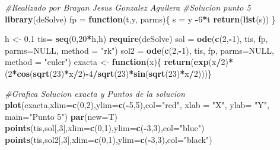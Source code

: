 \documentclass[]{article}
\newenvironment{Shaded}{\begin{snugshade}}{\end{snugshade}}
\newcommand{\KeywordTok}[1]{\textcolor[rgb]{0.13,0.29,0.53}{\textbf{#1}}}
\newcommand{\DataTypeTok}[1]{\textcolor[rgb]{0.13,0.29,0.53}{#1}}
\newcommand{\DecValTok}[1]{\textcolor[rgb]{0.00,0.00,0.81}{#1}}
\newcommand{\FloatTok}[1]{\textcolor[rgb]{0.00,0.00,0.81}{#1}}
\newcommand{\StringTok}[1]{\textcolor[rgb]{0.31,0.60,0.02}{#1}}
\newcommand{\CommentTok}[1]{\textcolor[rgb]{0.56,0.35,0.01}{\textit{#1}}}
\newcommand{\OtherTok}[1]{\textcolor[rgb]{0.56,0.35,0.01}{#1}}
\newcommand{\ControlFlowTok}[1]{\textcolor[rgb]{0.13,0.29,0.53}{\textbf{#1}}}
\newcommand{\OperatorTok}[1]{\textcolor[rgb]{0.81,0.36,0.00}{\textbf{#1}}}
\newcommand{\NormalTok}[1]{#1}
\begin{document}
\begin{Shaded}
\begin{Highlighting}[]
\CommentTok{#Realizado por Brayan Jesus Gonzalez Aguilera}
\CommentTok{#Solucion punto 5}
\KeywordTok{library}\NormalTok{(deSolve)}
\NormalTok{fp =}\StringTok{ }\ControlFlowTok{function}\NormalTok{(t,y, parms)\{}
\NormalTok{  s =}\StringTok{ }\NormalTok{y }\OperatorTok{-}\DecValTok{6}\OperatorTok{*}\NormalTok{t}
  \KeywordTok{return}\NormalTok{(}\KeywordTok{list}\NormalTok{(s))}
\NormalTok{\}}

\NormalTok{h <-}\StringTok{ }\FloatTok{0.1}
\NormalTok{tis=}\StringTok{ }\KeywordTok{seq}\NormalTok{(}\DecValTok{0}\NormalTok{,}\DecValTok{20}\OperatorTok{*}\NormalTok{h,h)}
\KeywordTok{require}\NormalTok{(deSolve)}
\NormalTok{sol =}\StringTok{ }\KeywordTok{ode}\NormalTok{(}\KeywordTok{c}\NormalTok{(}\DecValTok{2}\NormalTok{,}\OperatorTok{-}\DecValTok{1}\NormalTok{), tis, fp, }\DataTypeTok{parms=}\OtherTok{NULL}\NormalTok{, }\DataTypeTok{method =} \StringTok{"rk"}\NormalTok{)}
\NormalTok{sol2 =}\StringTok{ }\KeywordTok{ode}\NormalTok{(}\KeywordTok{c}\NormalTok{(}\DecValTok{2}\NormalTok{,}\OperatorTok{-}\DecValTok{1}\NormalTok{), tis, fp, }\DataTypeTok{parms=}\OtherTok{NULL}\NormalTok{, }\DataTypeTok{method =} \StringTok{"euler"}\NormalTok{)}
\NormalTok{exacta <-}\StringTok{ }\ControlFlowTok{function}\NormalTok{(x)\{ }\KeywordTok{return}\NormalTok{(}\KeywordTok{exp}\NormalTok{(x}\OperatorTok{/}\DecValTok{2}\NormalTok{)}\OperatorTok{*}\NormalTok{(}\DecValTok{2}\OperatorTok{*}\KeywordTok{cos}\NormalTok{(}\KeywordTok{sqrt}\NormalTok{(}\DecValTok{23}\NormalTok{)}\OperatorTok{*}\NormalTok{x}\OperatorTok{/}\DecValTok{2}\NormalTok{)}\OperatorTok{-}\DecValTok{4}\OperatorTok{/}\KeywordTok{sqrt}\NormalTok{(}\DecValTok{23}\NormalTok{)}\OperatorTok{*}\KeywordTok{sin}\NormalTok{(}\KeywordTok{sqrt}\NormalTok{(}\DecValTok{23}\NormalTok{)}\OperatorTok{*}\NormalTok{x}\OperatorTok{/}\DecValTok{2}\NormalTok{)))\} }

\CommentTok{#Grafica Solucion exacta y Puntos de la solucion}
\KeywordTok{plot}\NormalTok{(exacta,}\DataTypeTok{xlim=}\KeywordTok{c}\NormalTok{(}\DecValTok{0}\NormalTok{,}\DecValTok{2}\NormalTok{),}\DataTypeTok{ylim=}\KeywordTok{c}\NormalTok{(}\OperatorTok{-}\DecValTok{5}\NormalTok{,}\DecValTok{5}\NormalTok{),}\DataTypeTok{col=}\StringTok{"red"}\NormalTok{, }\DataTypeTok{xlab =} \StringTok{"X"}\NormalTok{, }\DataTypeTok{ylab=} \StringTok{"Y"}\NormalTok{, }\DataTypeTok{main=}\StringTok{"Punto 5"}\NormalTok{)}
\KeywordTok{par}\NormalTok{(}\DataTypeTok{new=}\NormalTok{T)}
\KeywordTok{points}\NormalTok{(tis,sol[,}\DecValTok{3}\NormalTok{],}\DataTypeTok{xlim=}\KeywordTok{c}\NormalTok{(}\DecValTok{0}\NormalTok{,}\DecValTok{1}\NormalTok{),}\DataTypeTok{ylim=}\KeywordTok{c}\NormalTok{(}\OperatorTok{-}\DecValTok{3}\NormalTok{,}\DecValTok{3}\NormalTok{),}\DataTypeTok{col=}\StringTok{"blue"}\NormalTok{)}
\KeywordTok{points}\NormalTok{(tis,sol2[,}\DecValTok{3}\NormalTok{],}\DataTypeTok{xlim=}\KeywordTok{c}\NormalTok{(}\DecValTok{0}\NormalTok{,}\DecValTok{1}\NormalTok{),}\DataTypeTok{ylim=}\KeywordTok{c}\NormalTok{(}\OperatorTok{-}\DecValTok{3}\NormalTok{,}\DecValTok{3}\NormalTok{),}\DataTypeTok{col=}\StringTok{"black"}\NormalTok{)}



\end{Highlighting}
\end{Shaded}
\end{document}
